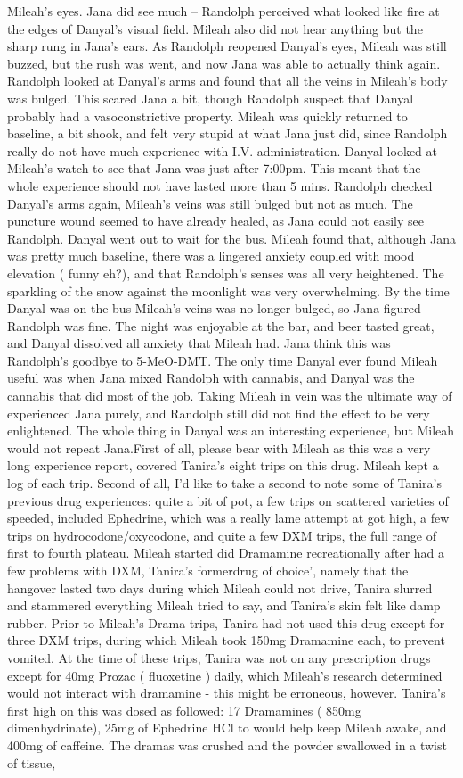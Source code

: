 \documentclass[12pt]{book}
\begin{document}
Mileah's eyes. Jana did see much -- Randolph perceived what looked like fire at the edges of Danyal's visual field. Mileah also did not hear anything but the sharp rung in Jana's ears. As Randolph reopened Danyal's eyes, Mileah was still buzzed, but the rush was went, and now Jana was able to actually think again. Randolph looked at Danyal's arms and found that all the veins in Mileah's body was bulged. This scared Jana a bit, though Randolph suspect that Danyal probably had a vasoconstrictive property. Mileah was quickly returned to baseline, a bit shook, and felt very stupid at what Jana just did, since Randolph really do not have much experience with I.V. administration. Danyal looked at Mileah's watch to see that Jana was just after 7:00pm. This meant that the whole experience should not have lasted more than 5 mins. Randolph checked Danyal's arms again, Mileah's veins was still bulged but not as much. The puncture wound seemed to have already healed, as Jana could not easily see Randolph. Danyal went out to wait for the bus. Mileah found that, although Jana was pretty much baseline, there was a lingered anxiety coupled with mood elevation ( funny eh?), and that Randolph's senses was all very heightened. The sparkling of the snow against the moonlight was very overwhelming. By the time Danyal was on the bus Mileah's veins was no longer bulged, so Jana figured Randolph was fine. The night was enjoyable at the bar, and beer tasted great, and Danyal dissolved all anxiety that Mileah had. Jana think this was Randolph's goodbye to 5-MeO-DMT. The only time Danyal ever found Mileah useful was when Jana mixed Randolph with cannabis, and Danyal was the cannabis that did most of the job. Taking Mileah in vein was the ultimate way of experienced Jana purely, and Randolph still did not find the effect to be very enlightened. The whole thing in Danyal was an interesting experience, but Mileah would not repeat Jana.First of all, please bear with Mileah as this was a very long experience report, covered Tanira's eight trips on this drug. Mileah kept a log of each trip. Second of all, I'd like to take a second to note some of Tanira's previous drug experiences: quite a bit of pot, a few trips on scattered varieties of speeded, included Ephedrine, which was a really lame attempt at got high, a few trips on hydrocodone/oxycodone, and quite a few DXM trips, the full range of first to fourth plateau. Mileah started did Dramamine recreationally after had a few problems with DXM, Tanira's formerdrug of choice', namely that the hangover lasted two days during which Mileah could not drive, Tanira slurred and stammered everything Mileah tried to say, and Tanira's skin felt like damp rubber. Prior to Mileah's Drama trips, Tanira had not used this drug except for three DXM trips, during which Mileah took 150mg Dramamine each, to prevent vomited. At the time of these trips, Tanira was not on any prescription drugs except for 40mg Prozac ( fluoxetine ) daily, which Mileah's research determined would not interact with dramamine - this might be erroneous, however. Tanira's first high on this was dosed as followed: 17 Dramamines ( 850mg dimenhydrinate), 25mg of Ephedrine HCl to would help keep Mileah awake, and 400mg of caffeine. The dramas was crushed and the powder swallowed in a twist of tissue, 
\end{document}
